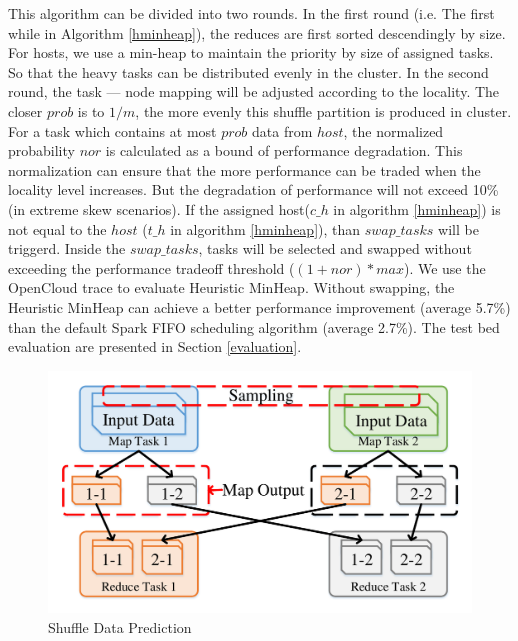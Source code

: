 This algorithm can be divided into two rounds. In the first round (i.e. The first while in Algorithm \ref{hminheap}), the reduces are first sorted descendingly by size. For hosts, we use a min-heap to maintain the priority by size of assigned tasks. So that the heavy tasks can be distributed evenly in the cluster.
In the second round, the task --- node mapping will be adjusted according to the locality. The closer $prob$ is to $1/m$, the more evenly this shuffle partition is produced in cluster. For a task which contains at most $prob$ data from $host$, the normalized probability $nor$ is calculated as a bound of performance degradation. This normalization can ensure that the more performance can be traded when the locality level increases. But the degradation of performance will not exceed 10\% (in extreme skew scenarios). If the assigned host($c\_h$ in algorithm \ref{hminheap}) is not equal to the $host$ ($t\_h$ in algorithm \ref{hminheap}), than $swap\_tasks$ will be triggerd. 
Inside the $swap\_tasks$, tasks will be selected and swapped without exceeding the performance tradeoff threshold ($\left(1+nor\right)*max$). We use the OpenCloud \cite{opencloudtrace} trace to evaluate Heuristic MinHeap. Without swapping, the Heuristic MinHeap can achieve a better performance improvement (average 5.7\%) than the default Spark FIFO scheduling algorithm (average 2.7\%). The test bed evaluation are presented in Section \ref{evaluation}.

\begin{figure}
	\centering
	\includegraphics[width=0.9\linewidth]{fig/shuffle}
	\caption{Shuffle Data Prediction}
	\label{fig:shuffle}
\end{figure}

